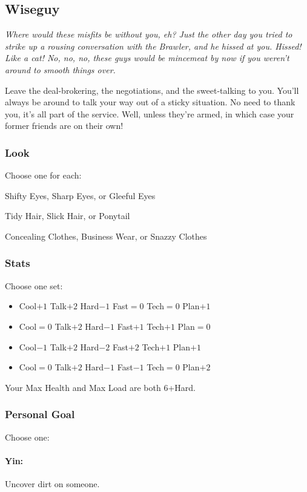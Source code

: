 


\subsection{Wiseguy}
{\itshape Where would these misfits be without you, eh? Just the other
  day you tried to strike up a rousing conversation with the Brawler,
  and he \emph{hissed} at you. Hissed! Like a cat! No, no, no, these
  guys would be mincemeat by now if you weren't around to smooth
  things over.

Leave the deal-brokering, the negotiations, and the sweet-talking to
you. You'll always be around to talk your way out of a sticky
situation. No need to thank you, it's all part of the service. Well,
unless they're armed, in which case your former friends are on their
own!}
\subsubsection{Look}
Choose one for each:

Shifty Eyes, Sharp Eyes, or Gleeful Eyes

Tidy Hair, Slick Hair, or Ponytail

Concealing Clothes, Business Wear, or Snazzy Clothes

\subsubsection{Stats}
Choose one set:
\begin{itemize}
\setlength\itemsep{0em}
\item Cool$+1$ Talk$+2$ Hard$-1$ Fast${=}0$ Tech${=}0$ Plan$+1$
\item Cool${=}0$ Talk$+2$ Hard$-1$ Fast$+1$ Tech$+1$ Plan${=}0$
\item Cool$-1$ Talk$+2$ Hard$-2$ Fast$+2$ Tech$+1$ Plan$+1$
\item Cool${=}0$ Talk$+2$ Hard$-1$ Fast$-1$ Tech${=}0$ Plan$+2$
\end{itemize}

Your Max Health and Max Load are both 6+Hard.

\subsubsection{Personal Goal}
Choose one:
\paragraph{Yin:} Uncover dirt on someone.
